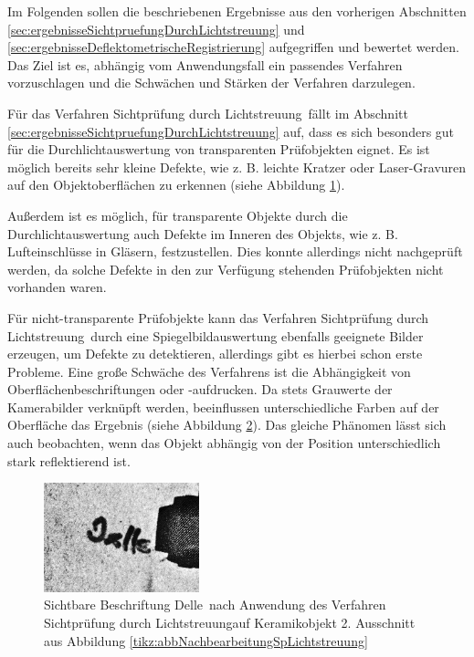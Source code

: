 Im Folgenden sollen die beschriebenen Ergebnisse aus den vorherigen Abschnitten \ref{sec:ergebnisseSichtpruefungDurchLichtstreuung} und \ref{sec:ergebnisseDeflektometrischeRegistrierung} aufgegriffen und bewertet werden.
Das Ziel ist es, abhängig vom Anwendungsfall ein passendes Verfahren vorzuschlagen und die Schwächen und Stärken der Verfahren darzulegen.

\p
Für das Verfahren \glqq Sichtprüfung durch Lichtstreuung\grqq ~fällt im Abschnitt \ref{sec:ergebnisseSichtpruefungDurchLichtstreuung} auf, dass es sich besonders gut für die Durchlichtauswertung von transparenten Prüfobjekten eignet.
Es ist möglich bereits sehr kleine Defekte, wie z. B. leichte Kratzer oder Laser-Gravuren auf den Objektoberflächen zu erkennen (siehe Abbildung \ref{tikz:abbErkennbareKleineDefekteLichtstreuung}).

{
	\begin{figure}[H]
		\centering
		
		\label{tikz:abbErkennbareKleineDefekteLichtstreuung}
	\end{figure}
}

\noindent
Außerdem ist es möglich, für transparente Objekte durch die Durchlichtauswertung auch Defekte im Inneren des Objekts, wie z. B. Lufteinschlüsse in Gläsern, festzustellen.
Dies konnte allerdings nicht nachgeprüft werden, da solche Defekte in den zur Verfügung stehenden Prüfobjekten nicht vorhanden waren.

\p
Für nicht-transparente Prüfobjekte kann das Verfahren \glqq Sichtprüfung durch Lichtstreuung\grqq ~durch eine Spiegelbildauswertung ebenfalls geeignete Bilder erzeugen, um Defekte zu detektieren, allerdings gibt es hierbei schon erste Probleme.
Eine große Schwäche des Verfahrens ist die Abhängigkeit von Oberflächenbeschriftungen oder -aufdrucken.
Da stets Grauwerte der Kamerabilder verknüpft werden, beeinflussen unterschiedliche Farben auf der Oberfläche das Ergebnis (siehe Abbildung \ref{img:delleBeschriftung}).
Das gleiche Phänomen lässt sich auch beobachten, wenn das Objekt abhängig von der Position unterschiedlich stark reflektierend ist.

{
	\begin{figure}[H]
		\centering
		\includegraphics[width=0.4\textwidth]{05_ergebnisse/ergDiskussion/figures/delleBeschriftung}
		\caption[Sichtbare Beschriftung nach Anwendung des Verfahrens aus Kapitel \ref{chp:sichtpruefungDurchLichtstreuung}]{Sichtbare Beschriftung \glqq Delle\grqq ~nach Anwendung des Verfahren \glqq Sichtprüfung durch Lichtstreuung\grqq auf Keramikobjekt 2. Ausschnitt aus Abbildung \ref{tikz:abbNachbearbeitungSpLichtstreuung}}
		\label{img:delleBeschriftung}
	\end{figure}
}


